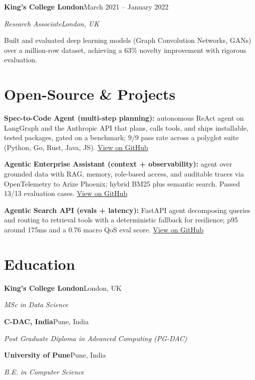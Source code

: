 \documentclass[10pt,a4paper]{article}
\newcommand{\entry}[4]{%
  {\color{company}\bfseries #1}\hfill {\color{muted}#2}\par
  \vspace{1pt}
  {\itshape #3}\hfill {\color{muted}\itshape #4}\par
  \vspace{3pt}%
}
\begin{document}
\entry{King's College London}{March 2021 -- January 2022}{Research Associate}{London, UK}
\begin{tight}
  \item Built and evaluated deep learning models (Graph Convolution Networks, GANs) over a million-row dataset, achieving a 63\% novelty improvement with rigorous evaluation.
\end{tight}

\section{Open-Source \& Projects}
\begin{tight}
  \item \textbf{Spec-to-Code Agent (multi-step planning):} autonomous ReAct agent on LangGraph and the Anthropic API that plans, calls tools, and ships installable, tested packages, gated on a benchmark; 9/9 pass rate across a polyglot suite (Python, Go, Rust, Java, JS). \href{https://github.com/abhijeetscode/Spec-to-Code-Agent}{View on GitHub}
  \item \textbf{Agentic Enterprise Assistant (context + observability):} agent over grounded data with RAG, memory, role-based access, and auditable traces via OpenTelemetry to Arize Phoenix; hybrid BM25 plus semantic search. Passed 13/13 evaluation cases. \href{https://github.com/abhijeetscode/Agentic-Enterprise-Assistant}{View on GitHub}
  \item \textbf{Agentic Search API (evals + latency):} FastAPI agent decomposing queries and routing to retrieval tools with a deterministic fallback for resilience; p95 around 175ms and a 0.76 macro QoS eval score. \href{https://github.com/abhijeetscode/search-agent}{View on GitHub}
\end{tight}

\section{Education}
{\color{company}\bfseries King's College London}\hfill {\color{muted}London, UK}\par
{\itshape MSc in Data Science}\par\vspace{2pt}
{\color{company}\bfseries C-DAC, India}\hfill {\color{muted}Pune, India}\par
{\itshape Post Graduate Diploma in Advanced Computing (PG-DAC)}\par\vspace{2pt}
{\color{company}\bfseries University of Pune}\hfill {\color{muted}Pune, India}\par
{\itshape B.E. in Computer Science}\par
\end{document}
